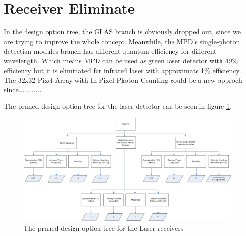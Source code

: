 \section{Receiver Eliminate}
\label{pruneReceiver}
In the design option tree, the GLAS branch is obviously dropped out, since we are trying to improve the whole concept. Meanwhile, the \ac{MPD}'s single-photon detection modules branch has different quantum efficiency for different wavelength. Which means MPD can be used as green laser detector with 49\% efficiency but it is eliminated for infrared laser with approximate 1\% efficiency. The 32x32-Pixel Array with In-Pixel Photon Counting could be a new approch since............

The pruned design option tree for the laser detector can be seen in figure \ref{fig:DOTreceiverPruned}.

\begin{figure}
\centering
\includegraphics[width=\textheight, angle=90]{chapters/img/DOTreceiverPruned.jpg}
\caption{The pruned design option tree for the Laser receivers}
\label{fig:DOTreceiverPruned}
\end{figure}